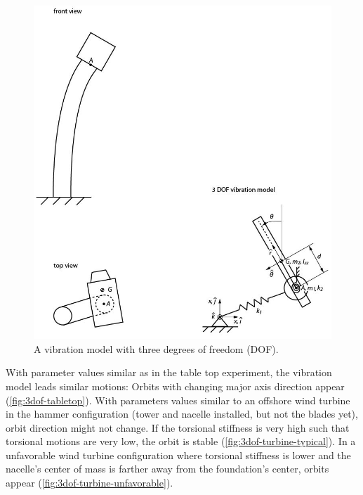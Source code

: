 \documentclass{article}
\begin{document}
\begin{figure}
    \centering
    \includegraphics{manuscript/figures/vibration_model.jpg}
    \caption{A vibration model with three degrees of freedom (DOF).}
    \label{fig:3dof-system}
\end{figure}

With parameter values similar as in the table top experiment, the vibration model leads similar motions: Orbits with changing major axis direction appear (\autoref{fig:3dof-tabletop}). With parameters values similar to an offshore wind turbine in the hammer configuration (tower and nacelle installed, but not the blades yet), orbit direction might not change. If the torsional stiffness is very high such that torsional motions are very low, the orbit is stable (\autoref{fig:3dof-turbine-typical}). In a unfavorable wind turbine configuration where torsional stiffness is lower and the nacelle's center of mass is farther away from the foundation's center, orbits appear (\autoref{fig:3dof-turbine-unfavorable}).
\end{document}
